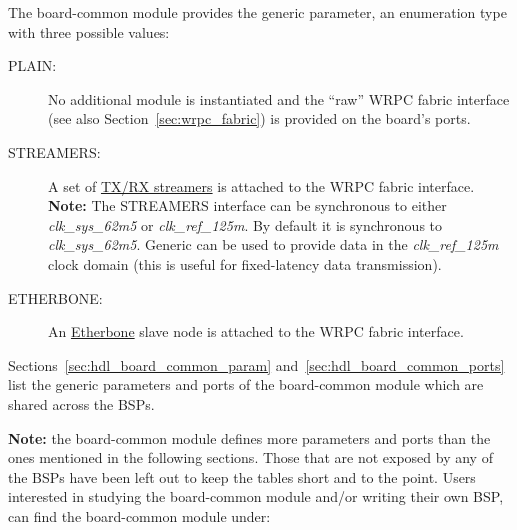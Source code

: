 The board-common module provides the  generic parameter, an enumeration
type with three possible values:

\begin{description}
\item[PLAIN:] No additional module is instantiated and the ``raw'' WRPC fabric interface (see also
  Section~\ref{sec:wrpc_fabric}) is provided on the board's ports.
\item[STREAMERS:] A set of \href{https://gitlab.com/ohwr/project/wr-cores/wikis/WR_Streamers}{TX/RX
  streamers} is attached to the WRPC fabric interface.\\
  \textbf{Note:} The STREAMERS interface can be synchronous to either \textit{clk\_sys\_62m5}
  or \textit{clk\_ref\_125m}. By default it is synchronous to \textit{clk\_sys\_62m5}. Generic
  can be used to provide data in the \textit{clk\_ref\_125m} clock domain (this is useful for
  fixed-latency data transmission).
\item[ETHERBONE:] An \href{https://gitlab.com/ohwr/project/etherbone-core/wikis}{Etherbone} slave node
  is attached to the WRPC fabric interface.
\end{description}

Sections~\ref{sec:hdl_board_common_param} and~\ref{sec:hdl_board_common_ports} list the generic
parameters and ports of the board-common module which are shared across the BSPs.

\textbf{Note:} the board-common module defines more parameters and ports than the ones mentioned in
the following sections. Those that are not exposed by any of the BSPs have been left out to keep the
tables short and to the point. Users interested in studying the board-common module and/or writing
their own BSP, can find the board-common module under:
\\

\newpage
{}
\label{sec:hdl_board_common_param}

